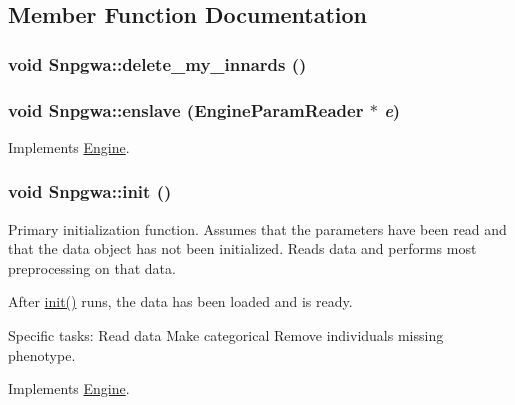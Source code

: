 \subsection{Member Function Documentation}
\hypertarget{classSnpgwa_ab4eea76f9654a8456bd046213f23d320}{
\subsubsection[{delete\_\-my\_\-innards}]{\setlength{\rightskip}{0pt plus 5cm}void Snpgwa::delete\_\-my\_\-innards ()}}
\label{classSnpgwa_ab4eea76f9654a8456bd046213f23d320}
\hypertarget{classSnpgwa_a976e974bf71743c194a9c098cefff04c}{
\subsubsection[{enslave}]{\setlength{\rightskip}{0pt plus 5cm}void Snpgwa::enslave ({\bf EngineParamReader} $\ast$ {\em e})}}
\label{classSnpgwa_a976e974bf71743c194a9c098cefff04c}


Implements \hyperlink{classEngine_a023e094182312b1732fe53754c2fe5cb}{Engine}.

\hypertarget{classSnpgwa_a4d061e98cd1a9b5d9f7d666dea3cd0af}{
\subsubsection[{init}]{\setlength{\rightskip}{0pt plus 5cm}void Snpgwa::init ()}}
\label{classSnpgwa_a4d061e98cd1a9b5d9f7d666dea3cd0af}
Primary initialization function. Assumes that the parameters have been read and that the data object has not been initialized. Reads data and performs most preprocessing on that data.

After \hyperlink{classSnpgwa_a4d061e98cd1a9b5d9f7d666dea3cd0af}{init()} runs, the data has been loaded and is ready.

Specific tasks: Read data Make categorical Remove individuals missing phenotype. 

Implements \hyperlink{classEngine_aaa054d596fb8ced6e3eb4bee208f8c3d}{Engine}.

